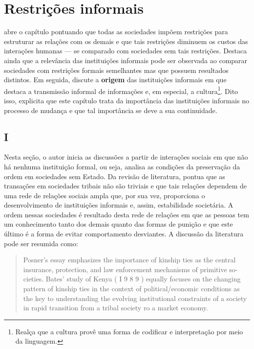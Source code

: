 \section*{Restrições informais}

\autor abre o capítulo pontuando que todas as sociedades impõem restrições para estruturar as relações com os demais e que tais restrições diminuem os custos das interações humanas --- se comparado com sociedades sem tais restrições. Destaca ainda que a relevância das instituições informais pode ser observada ao comparar sociedades com restrições formais semelhantes mas que possuem resultados distintos. Em seguida, discute a \textbf{origem} das instituições informais em que destaca a transmissão informal de informações e, em especial, a cultura\footnote{
	Realça que a cultura provê uma forma de codificar e interpretação por meio da linguagem.
}. Dito isso, explicita que este capítulo trata da importância das instituições informais no processo de mudança e que tal importância se deve a sua continuidade.

\subsection*{I}

Nesta seção, o autor inicia as discussões a partir de interações sociais em que não há nenhuma instituição formal, ou seja, analisa as condições da preservação da ordem em sociedades sem Estado. Da revisão de literatura, pontua que as transações em sociedades tribais não são triviais e que tais relações dependem de uma rede de relações sociais ampla que, por sua vez, proporciona o desenvolvimento de instituições informais e, assim, estabilidade societária. A ordem nessas sociedades é resultado desta rede de relações em que as pessoas tem um conhecimento tanto dos demais quanto das formas de punição e que este último é a forma de evitar comportamento desviantes. A discussão da literatura pode ser resumida como:

\begin{quote}
	Posner's essay emphasizes the importance of kinship ties as the central
	insurance, protection, and law enforcement mechanisms of primitive so­
	cieties. Bates' study of Kenya ( I 9 8 9 ) equally focuses on the changing
	pattern of kinship ties in the context of political/economic conditions as
	the key to understanding the evolving institutional constraints of a society
	in rapid transition from a tribal society ro a market economy.	
\end{quote}

